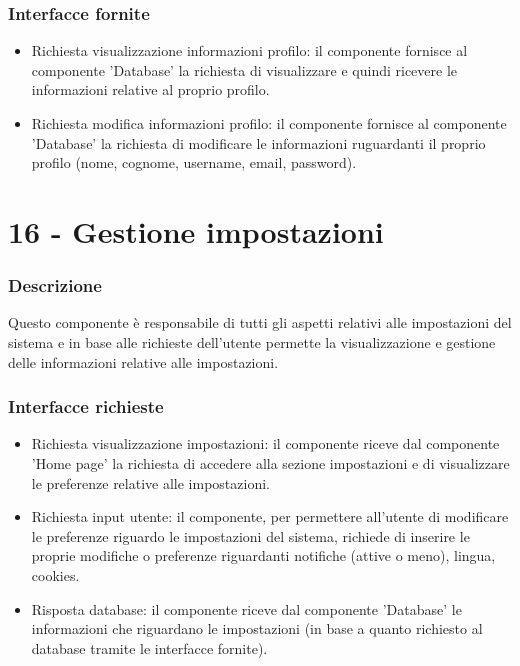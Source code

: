 \documentclass[a4paper,12pt]{article}
\begin{document}
\subsubsection*{Interfacce fornite}
\begin{itemize} \setlength\itemsep{0.01em}
\item {\sffamily Richiesta visualizzazione informazioni profilo}: il componente fornisce al componente 'Database'  la richiesta di visualizzare e quindi ricevere le informazioni relative al proprio profilo.
\item {\sffamily Richiesta modifica informazioni profilo}: il componente fornisce al componente 'Database' la richiesta di modificare le informazioni ruguardanti il proprio profilo (nome, cognome, username, email, password).

\end{itemize}


\section*{16 -  Gestione impostazioni}
\subsubsection*{Descrizione}
Questo componente è responsabile di tutti gli aspetti relativi alle impostazioni del sistema e in base alle richieste dell'utente permette la visualizzazione e gestione delle informazioni relative alle impostazioni.
\subsubsection*{Interfacce richieste}
\begin{itemize} \setlength\itemsep{0.01em}
\item {\sffamily Richiesta visualizzazione impostazioni}: il componente riceve dal componente 'Home page'  la richiesta di accedere alla sezione impostazioni e di visualizzare le preferenze relative alle impostazioni.
\item {\sffamily Richiesta input utente}:  il componente, per permettere all'utente di modificare le preferenze riguardo le impostazioni del sistema, richiede di inserire le proprie modifiche o preferenze  riguardanti notifiche (attive o meno), lingua, cookies.
\item {\sffamily Risposta database}: il componente riceve dal componente 'Database' le informazioni che riguardano le impostazioni (in base a quanto richiesto al database tramite le interfacce fornite).

\end{itemize}
\end{document}
